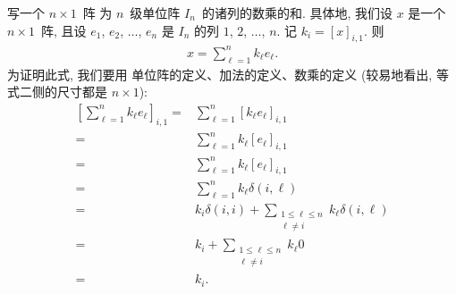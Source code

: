 \documentclass[%
    UTF8,%
    fontset=none,%
    punct=kaiming,%
    zihao=-4,%
    a4paper,%
    oneside,%
]{ctexbook}
\let\emph\relax
\renewcommand*{\leq}{\leqslant}
\begin{document}
\emph{可}写一个 \(n \times 1\)~阵%
为 \(n\)~级单位阵 \(I_n\)~的诸列的数乘的和.
具体地, 我们设 \(x\) 是一个 \(n \times 1\)~阵,
且设 \(e_1\), \(e_2\), \(\dots\), \(e_n\) 是
\(I_n\) 的列 \(1\), \(2\), \(\dots\), \(n\).
记 \(k_i = [x]_{i,1}\).
则
\begin{align*}
    x = \sum_{\ell = 1}^{n} {k_\ell e_\ell}.
\end{align*}
为证明此式, 我们要用%
单位阵的定义、加法的定义、数乘的定义
(较易地看出, 等式二侧的尺寸都是 \(n \times 1\)):
\begin{align*}
    \left[ \sum_{\ell = 1}^{n} {k_\ell e_\ell} \right]_{i,1}
    = {} &
    \sum_{\ell = 1}^{n} {[k_\ell e_\ell]_{i,1}}
    \\
    = {} &
    \sum_{\ell = 1}^{n} {k_\ell [e_\ell]_{i,1}}
    \\
    = {} &
    \sum_{\ell = 1}^{n} {k_\ell [e_\ell]_{i,1}}
    \\
    = {} &
    \sum_{\ell = 1}^{n} {k_\ell \delta(i, \ell)}
    \\
    = {} &
    k_i \delta(i, i)
    + \sum_{\substack{1 \leq \ell \leq n \\ \ell \neq i}}
    {k_\ell \delta(i, \ell)}
    \\
    = {} &
    k_i
    + \sum_{\substack{1 \leq \ell \leq n \\ \ell \neq i}}
    {k_\ell 0}
    \\
    = {} &
    k_i.
\end{align*}
\end{document}
